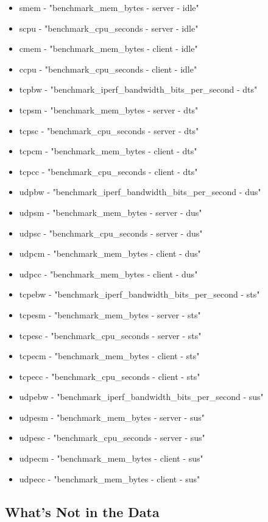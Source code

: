 \begin{itemize}
    \item smem - "benchmark\_mem\_bytes - server - idle"
    \item scpu - "benchmark\_cpu\_seconds - server - idle"
    \item cmem - "benchmark\_mem\_bytes - client - idle"
    \item ccpu - "benchmark\_cpu\_seconds - client - idle"
    \item tcpbw - "benchmark\_iperf\_bandwidth\_bits\_per\_second - dts"
    \item tcpsm - "benchmark\_mem\_bytes - server - dts"
    \item tcpsc - "benchmark\_cpu\_seconds - server - dts"
    \item tcpcm - "benchmark\_mem\_bytes - client - dts"
    \item tcpcc - "benchmark\_cpu\_seconds - client - dts"
    \item udpbw - "benchmark\_iperf\_bandwidth\_bits\_per\_second - dus"
    \item udpsm - "benchmark\_mem\_bytes - server - dus"
    \item udpsc - "benchmark\_cpu\_seconds - server - dus"
    \item udpcm - "benchmark\_mem\_bytes - client - dus"
    \item udpcc - "benchmark\_mem\_bytes - client - dus"
    \item tcpebw - "benchmark\_iperf\_bandwidth\_bits\_per\_second - sts"
    \item tcpesm - "benchmark\_mem\_bytes - server - sts"
    \item tcpesc - "benchmark\_cpu\_seconds - server - sts"
    \item tcpecm - "benchmark\_mem\_bytes - client - sts"
    \item tcpecc - "benchmark\_cpu\_seconds - client - sts"
    \item udpebw - "benchmark\_iperf\_bandwidth\_bits\_per\_second - sus"
    \item udpesm - "benchmark\_mem\_bytes - server - sus"
    \item udpesc - "benchmark\_cpu\_seconds - server - sus"
    \item udpecm - "benchmark\_mem\_bytes - client - sus"
    \item udpecc - "benchmark\_mem\_bytes - client - sus"
\end{itemize}

\subsection{What's Not in the Data}

